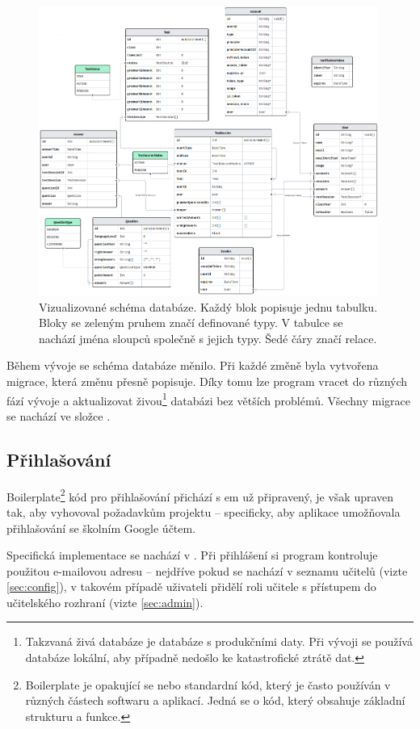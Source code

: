 \begin{figure}[H]
    \centering
    \includegraphics[width=420px]{images/02technologie/schema3.png}
    \caption{Vizualizované schéma databáze. Každý blok popisuje jednu tabulku. Bloky se zeleným pruhem značí definované typy. V tabulce se nachází jména sloupců společně s jejich typy. Šedé čáry značí relace.}
    \label{schema}
\end{figure}

Během vývoje se schéma databáze měnilo. Při každé změně byla vytvořena migrace, která změnu přesně popisuje. Díky tomu lze program vracet do různých fází vývoje a aktualizovat živou\footnote{Takzvaná živá databáze je databáze s produkčními daty. Při vývoji se používá databáze lokální, aby případně nedošlo ke katastrofické ztrátě dat.} databázi bez větších problémů. Všechny migrace se nachází ve složce .

\subsection{Přihlašování}
\label{sec:login}

Boilerplate\footnote{Boilerplate je opakující se nebo standardní kód, který je často používán v různých částech softwaru a aplikací. Jedná se o kód, který obsahuje základní strukturu a funkce.} kód pro přihlašování přichází s em už připravený, je však upraven tak, aby vyhovoval požadavkům projektu -- specificky, aby aplikace umožňovala přihlašování se školním Google účtem.

Specifická implementace se nachází v . Při přihlášení si program kontroluje použitou e-mailovou adresu -- nejdříve pokud se nachází v seznamu učitelů (vizte \ref{sec:config}), v takovém případě uživateli přidělí roli učitele s přístupem do učitelského rozhraní (vizte \ref{sec:admin}). 

